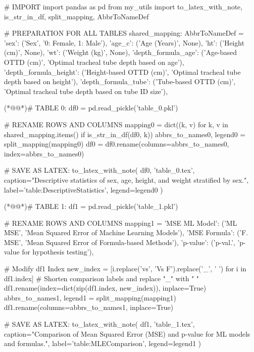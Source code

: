 \documentclass[11pt]{article}
\begin{document}
\begin{python}

# IMPORT
import pandas as pd
from my_utils import to_latex_with_note, is_str_in_df, split_mapping, AbbrToNameDef

# PREPARATION FOR ALL TABLES
shared_mapping: AbbrToNameDef = {
    'sex': ('Sex', '0: Female, 1: Male'),
    'age_c': ('Age (Years)', None),
    'ht': ('Height (cm)', None),
    'wt': ('Weight (kg)', None),
    'depth_formula_age': ('Age-based OTTD (cm)', 'Optimal tracheal tube depth based on age'),
    'depth_formula_height': ('Height-based OTTD (cm)', 'Optimal tracheal tube depth based on height'),
    'depth_formula_tube': ('Tube-based OTTD (cm)', 'Optimal tracheal tube depth based on tube ID size'),
}

(*@@*)# TABLE 0:
df0 = pd.read_pickle('table_0.pkl')

# RENAME ROWS AND COLUMNS
mapping0 = dict((k, v) for k, v in shared_mapping.items() if is_str_in_df(df0, k)) 
abbrs_to_names0, legend0 = split_mapping(mapping0)
df0 = df0.rename(columns=abbrs_to_names0, index=abbrs_to_names0)

# SAVE AS LATEX:
to_latex_with_note(
    df0, 'table_0.tex',
    caption="Descriptive statistics of sex, age, height, and weight stratified by sex.", 
    label='table:DescriptiveStatistics',
    legend=legend0
)


(*@@*)# TABLE 1:
df1 = pd.read_pickle('table_1.pkl')

# RENAME ROWS AND COLUMNS
mapping1 = {
    'MSE ML Model': ('ML MSE', 'Mean Squared Error of Machine Learning Models'),
    'MSE Formula': ('F. MSE', 'Mean Squared Error of Formula-based Methods'),
    'p-value': ('p-val.', 'p-value for hypothesis testing'),
}

# Modify df1 Index
new_index = [i.replace('vs', 'Vs F').replace('_', ' ') for i in df1.index] # Shorten comparison labels and replace "_" with " "
df1.rename(index=dict(zip(df1.index, new_index)), inplace=True)
abbrs_to_names1, legend1 = split_mapping(mapping1)
df1.rename(columns=abbrs_to_names1, inplace=True)

# SAVE AS LATEX:
to_latex_with_note(
    df1, 'table_1.tex',
    caption="Comparison of Mean Squared Error (MSE) and p-value for ML models and formulas.", 
    label='table:MLEComparison',
    legend=legend1
)

\end{python}
\end{document}
